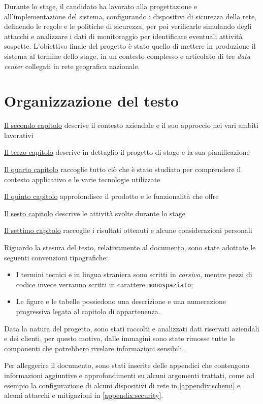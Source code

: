 Durante lo stage, il candidato ha lavorato alla progettazione e all'implementazione del sistema, configurando i dispositivi di sicurezza della rete, definendo le regole e le politiche di sicurezza, per poi verificarle simulando degli attacchi e analizzare i dati di monitoraggio per identificare eventuali attività sospette. L'obiettivo finale del progetto è stato quello di mettere in produzione il sistema al termine dello stage, in un contesto complesso e articolato di tre \emph{data center} collegati in rete geografica nazionale.

\section{Organizzazione del testo}

\begin{description}
    \item \hyperref[cap:azienda]{Il secondo capitolo} descrive il contesto aziendale e il suo approccio nei vari ambiti lavorativi
    \item \hyperref[cap:stage]{Il terzo capitolo} descrive in dettaglio il progetto di stage e la sua pianificazione
    \item \hyperref[cap:tecnologie]{Il quarto capitolo} raccoglie tutto ciò che è stato studiato per comprendere il contesto applicativo e le varie tecnologie utilizzate
    \item \hyperref[cap:prodotto]{Il quinto capitolo} approfondisce il prodotto e le funzionalità che offre
    \item \hyperref[cap:svolgimento]{Il sesto capitolo} descrive le attività svolte durante lo stage
    \item \hyperref[cap:conclusioni]{Il settimo capitolo} raccoglie i risultati ottenuti e alcune considerazioni personali
\end{description}

Riguardo la stesura del testo, relativamente al documento, sono state adottate le seguenti convenzioni tipografiche:
\begin{itemize}
	\item I termini tecnici e in lingua straniera sono scritti in \emph{corsivo}, mentre pezzi di codice invece verranno scritti in carattere \texttt{monospaziato};
	\item Le figure e le tabelle possiedono una descrizione e una numerazione progressiva legata al capitolo di appartenenza.
\end{itemize}

Data la natura del progetto, sono stati raccolti e analizzati dati riservati aziendali e dei clienti, per questo motivo, dalle immagini sono state rimosse tutte le componenti che potrebbero rivelare informazioni sensibili.

Per alleggerire il documento, sono stati inserite delle appendici che contengono informazioni aggiuntive e approfondimenti su alcuni argomenti trattati, come ad esempio la configurazione di alcuni dispositivi di rete in \autoref{appendix:schemi} e alcuni attacchi e mitigazioni in \autoref{appendix:security}.